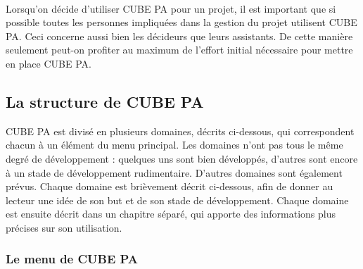 \ \\
Lorsqu'on décide d'utiliser CUBE PA pour un projet, il est important que si possible toutes les personnes impliquées dans la gestion du projet utilisent CUBE PA. Ceci concerne aussi bien les décideurs que leurs assistants. De cette manière seulement peut-on profiter au maximum de l'effort initial nécessaire pour mettre en place CUBE PA.
	
\subsection{La structure de CUBE PA} %

CUBE PA est divisé en plusieurs domaines, décrits ci-dessous, qui correspondent chacun à un élément du menu principal. Les domaines n'ont pas tous le même degré de développement : quelques uns sont bien développés, d'autres sont encore à un stade de développement rudimentaire. D'autres domaines sont également prévus. Chaque domaine est brièvement décrit ci-dessous, afin de donner au lecteur une idée de son but et de son stade de développement. Chaque domaine est ensuite décrit dans un chapitre séparé, qui apporte des informations plus précises sur son utilisation.

\pagebreak
\subsubsection{Le menu de CUBE PA} %

\setlength{\abovecaptionskip}{0pt}

